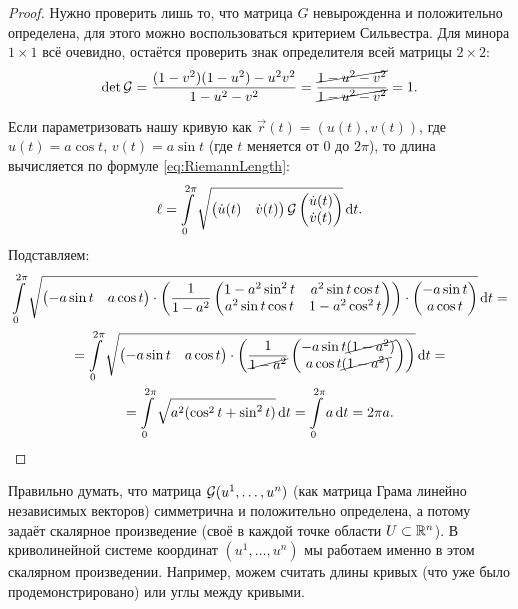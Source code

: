 \begin{proof}
	Нужно проверить лишь то, что матрица $G$ невырожденна и положительно определена, для этого можно воспользоваться критерием Сильвестра. Для минора $1 \times 1$ всё очевидно, остаётся проверить знак определителя всей матрицы $2 \times 2$:
	\[
		\det\mathcal{G} = \frac{(1 - v^2)(1 - u^2) - u^2v^2}{1 - u^2 - v^2} = \frac{\cancel{1 - u^2 - v^2}}{\cancel{1 - u^2 - v^2}} = 1.
	\]
	
	Если параметризовать нашу кривую как $\vec{r}(t) = (u(t), v(t))$, где $u(t) = a\cos t$, $v(t) = a\sin t$ (где $t$ меняется от $0$ до $2\pi$), то длина вычисляется по формуле \eqref{eq:RiemannLength}:
	\[
		\ell = \int\limits_0^{2\pi}\sqrt{\begin{pmatrix}\dot{u}(t) & \dot{v}(t)\end{pmatrix} \mathcal{G} \begin{pmatrix}\dot{u}(t) \\ \dot{v}(t) \end{pmatrix}}\mathop{}\!\mathrm{d} t.
	\]
	Подставляем:
	\begin{multline*}
		\int\limits_0^{2\pi}\sqrt{\begin{pmatrix}-a\sin t & a\cos t\end{pmatrix} \cdot \left(\frac{1}{1 - a^2}\begin{pmatrix} 1 - a^2\sin^2t & a^2\sin t\cos t \\ a^2\sin t\cos t & 1 - a^2\cos^2t \end{pmatrix}\right) \cdot \begin{pmatrix} -a\sin t \\ a\cos t \end{pmatrix}}\mathop{}\!\mathrm{d} t =\\ = \int\limits_0^{2\pi}\sqrt{\begin{pmatrix} -a\sin t & a\cos t \end{pmatrix} \cdot \left(\frac{1}{\cancel{1 - a^2}}\begin{pmatrix} -a\sin t\cancel{(1 - a^2)} \\ a\cos t\cancel{(1 - a^2)}\end{pmatrix}\right)}\mathop{}\!\mathrm{d} t =\\ = \int\limits_0^{2\pi}\sqrt{a^2(\cos^2t + \sin^2t)}\mathop{}\!\mathrm{d} t = \int\limits_0^{2\pi}a\mathop{}\!\mathrm{d} t = 2\pi a.
	\end{multline*}
\end{proof}

Правильно думать, что матрица $\mathcal{G}(u^1, \ldots, u^n)$ (как матрица Грама линейно независимых векторов) симметрична и положительно определена, а потому задаёт скалярное произведение (своё в каждой точке области $U \subset \mathbb{R}^n$). В криволинейной системе координат $(u^1, \ldots, u^n)$ мы работаем именно в этом скалярном произведении. Например, можем считать длины кривых (что уже было продемонстрировано) или углы между кривыми.

